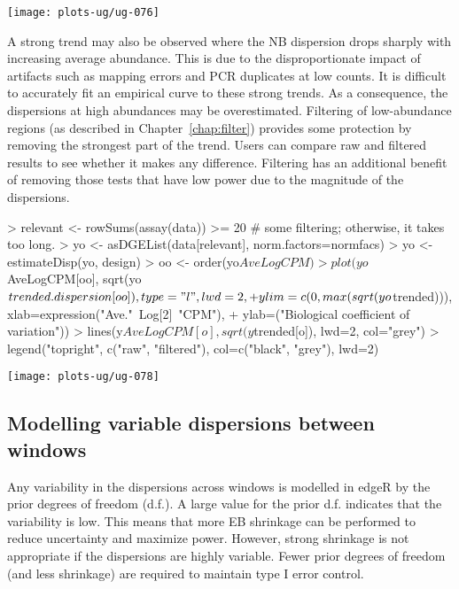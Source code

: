 \documentclass[12pt]{report}
\renewenvironment{Schunk}{\vspace{0pt}}{\vspace{0pt}}
\newcommand{\edger}{edgeR}
\begin{document}
\begin{center}
\texttt{[image: plots-ug/ug-076]}
\end{center}

A strong trend may also be observed where the NB dispersion drops sharply with increasing average abundance.
This is due to the disproportionate impact of artifacts such as mapping errors and PCR duplicates at low counts. 
It is difficult to accurately fit an empirical curve to these strong trends.  
As a consequence, the dispersions at high abundances may be overestimated. 
Filtering of low-abundance regions (as described in Chapter~\ref{chap:filter}) provides some protection by removing the strongest part of the trend.
Users can compare raw and filtered results to see whether it makes any difference.
Filtering has an additional benefit of removing those tests that have low power due to the magnitude of the dispersions.

\begin{Schunk}
\begin{Sinput}
> relevant <- rowSums(assay(data)) >= 20 # some filtering; otherwise, it takes too long.
> yo <- asDGEList(data[relevant], norm.factors=normfacs)
> yo <- estimateDisp(yo, design)
> oo <- order(yo$AveLogCPM)
> plot(yo$AveLogCPM[oo], sqrt(yo$trended.dispersion[oo]), type="l", lwd=2,
+   ylim=c(0, max(sqrt(yo$trended))), xlab=expression("Ave."~Log[2]~"CPM"), 
+   ylab=("Biological coefficient of variation"))
> lines(y$AveLogCPM[o], sqrt(y$trended[o]), lwd=2, col="grey")
> legend("topright", c("raw", "filtered"), col=c("black", "grey"), lwd=2)
\end{Sinput}
\end{Schunk}

\begin{center}
\texttt{[image: plots-ug/ug-078]}
\end{center}

\subsection{Modelling variable dispersions between windows}
Any variability in the dispersions across windows is modelled in \edger{} by the prior degrees of freedom (d.f.).
A large value for the prior d.f. indicates that the variability is low. 
This means that more EB shrinkage can be performed to reduce uncertainty and maximize power. 
However, strong shrinkage is not appropriate if the dispersions are highly variable. 
Fewer prior degrees of freedom (and less shrinkage) are required to maintain type I error control. 
\end{document}
